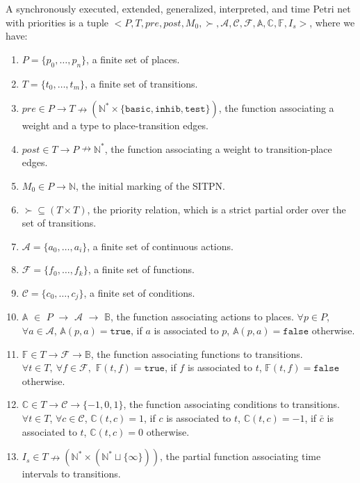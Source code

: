 \begin{definition}[SITPN]
  \label{def:sitpn}
  A synchronously executed, extended, generalized, interpreted, and
  time Petri net with priorities is a tuple
  ${<}P,T,pre,post,M_0,{\succ},\mathcal{A},\mathcal{C},\mathcal{F},
  \mathbb{A},\mathbb{C},\mathbb{F},{I_s}{>}$, where we have:
  \begin{enumerate}
  \item $P=\{p_0,\ldots,p_n\}$, a finite set of places.
  \item $T=\{t_0,\ldots,t_m\}$, a finite set of transitions.
  \item
    $pre\in{}P\rightarrow{}T\nrightarrow(\mathbb{N}^{*}\times\{\mathtt{basic},\mathtt{inhib},\mathtt{test}\})$,
    the function associating a weight and a type to place-transition
    edges.
  \item $post\in{}T\rightarrow{}P\nrightarrow\mathbb{N}^{*}$, the
    function associating a weight to transition-place edges.
  \item $M_0\in{}P\rightarrow\mathbb{N}$, the initial marking of the SITPN.
  \item $\succ\subseteq{}(T\times{}T)$, the priority relation, which
    is a strict partial order over the set of transitions.
  \item $\mathcal{A}=\{a_0,\ldots,a_i\}$, a finite set of continuous actions.
  \item $\mathcal{F}=\{f_0,\ldots,f_k\}$, a finite set of functions.
  \item $\mathcal{C}=\{c_0,\ldots,c_j\}$, a finite set of conditions.
  \item $\mathbb{A}$ $\in$ ${}P$ $\rightarrow$ $\mathcal{A}$
    $\rightarrow$ $\mathbb{B}$, the function associating actions to
    places.  $\forall{}p\in{}P$, $\forall{}a\in\mathcal{A}$,
    $\mathbb{A}(p,a)=\mathtt{true}$, if $a$ is associated to $p$,
    $\mathbb{A}(p,a)=\mathtt{false}$ otherwise.
  \item $\mathbb{F}\in{}T\rightarrow\mathcal{F}\rightarrow\mathbb{B}$,
    the function associating functions to transitions.
    $\forall{}t\in{}T,~\forall{}f\in\mathcal{F},$
    $\mathbb{F}(t,f)=\mathtt{true}$, if $f$ is associated to $t$,
    $\mathbb{F}(t,f)=\mathtt{false}$ otherwise.
    
  \item $\mathbb{C} \in T \rightarrow \mathcal{C} \rightarrow\{-1,0,1\}$, the
    function associating conditions to transitions.
    $\forall t \in T$, $\forall c \in \mathcal{C}$,
    $\mathbb{C}(t,c)=1$, if $c$ is associated to $t$,
    $\mathbb{C}(t,c)=-1$, if $\bar{c}$ is associated to $t$,
    $\mathbb{C}(t,c)=0$ otherwise.
  \item
    $I_s\in{}T\nrightarrow(\mathbb{N}^{*}\times(\mathbb{N^{*}}\sqcup\{\infty\}))$,
    the partial function associating time intervals to transitions.
  \end{enumerate}
\end{definition}



